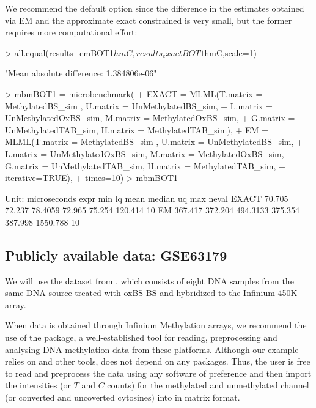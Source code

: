 \documentclass{article}
\begin{document}
We recommend the default option  since the difference in the estimates obtained via EM and the approximate exact constrained is very small, but the former requires more computational effort:

\begin{Schunk}
\begin{Sinput}
>  all.equal(results_emBOT1$hmC,results_exactBOT1$hmC,scale=1)
\end{Sinput}
\begin{Soutput}
[1] "Mean absolute difference: 1.384806e-06"
\end{Soutput}
\end{Schunk}

\begin{Schunk}
\begin{Sinput}
>  mbmBOT1 = microbenchmark(
+     EXACT = MLML(T.matrix = MethylatedBS_sim , U.matrix = UnMethylatedBS_sim,
+                  L.matrix = UnMethylatedOxBS_sim, M.matrix = MethylatedOxBS_sim,
+                  G.matrix = UnMethylatedTAB_sim, H.matrix = MethylatedTAB_sim),
+     EM =    MLML(T.matrix = MethylatedBS_sim , U.matrix = UnMethylatedBS_sim,
+                  L.matrix = UnMethylatedOxBS_sim, M.matrix = MethylatedOxBS_sim,
+                  G.matrix = UnMethylatedTAB_sim, H.matrix = MethylatedTAB_sim,
+                  iterative=TRUE),
+     times=10)
>  mbmBOT1
\end{Sinput}
\begin{Soutput}
Unit: microseconds
  expr     min      lq     mean  median      uq      max neval
 EXACT  70.705  72.237  78.4059  72.965  75.254  120.414    10
    EM 367.417 372.204 494.3133 375.354 387.998 1550.788    10
\end{Soutput}
\end{Schunk}


\subsection{Publicly available data: GSE63179}

We will use the dataset from \cite{10.1371/journal.pone.0118202}, which consists of eight DNA samples from the same DNA source treated with oxBS-BS and hybridized to the Infinium 450K array.

When data is obtained through Infinium Methylation arrays, we recommend the use of the  package, a well-established tool for reading, preprocessing and analysing DNA methylation data from these platforms. Although our example relies on  and other \Bioconductor{} tools,  does not depend on any packages. Thus, the user is free to read and preprocess the data using any software of preference and then import the intensities (or $T$ and $C$ counts) for the methylated and unmethylated channel (or converted and uncoverted cytosines) into \R{} in matrix format.
\end{document}
